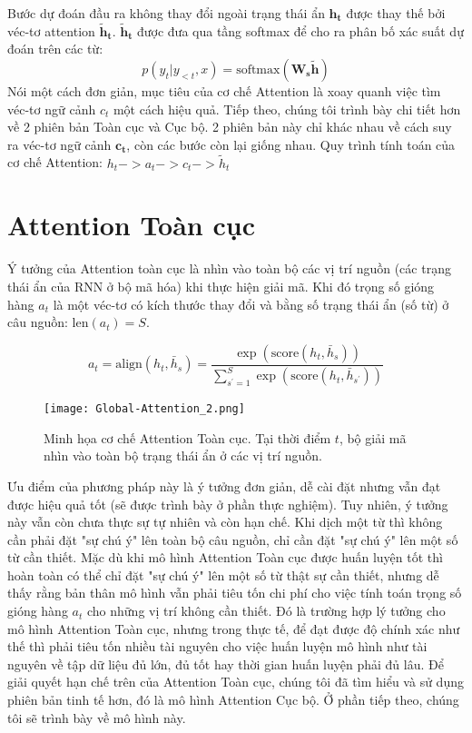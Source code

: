 Bước dự đoán đầu ra không thay đổi ngoài trạng thái ẩn $\bm{h_t}$ được thay thế bởi véc-tơ attention $\bm{\tilde{h}_t}$. $\bm{\tilde{h}_t}$ được đưa qua tầng softmax để cho ra phân bố xác suất dự đoán trên các từ:
\begin{equation}
p(y_t | y_{<t}, x) = \text{softmax}(\bm{W_s\tilde{h}})
\end{equation}
Nói một cách đơn giản, mục tiêu của cơ chế Attention là xoay quanh việc tìm véc-tơ ngữ cảnh $c_t$ một cách hiệu quả.
Tiếp theo, chúng tôi trình bày chi tiết hơn về 2 phiên bản Toàn cục và Cục bộ. 2 phiên bản này chỉ khác nhau về cách suy ra véc-tơ ngữ cảnh $\bm{c_t}$, còn các bước còn lại giống nhau.
Quy trình tính toán của cơ chế Attention: $h_t -> a_t -> c_t -> \tilde{h}_t$
\section{Attention Toàn cục}
Ý tưởng của Attention toàn cục là nhìn vào toàn bộ các vị trí nguồn (các trạng thái ẩn của RNN ở bộ mã hóa) khi thực hiện giải mã.
Khi đó trọng số gióng hàng $a_t$ là một véc-tơ có kích thước thay đổi và bằng số trạng thái ẩn (số từ) ở câu nguồn: $\text{len}(a_t) = S$.

\begin{equation}
a_t = \text{align}(h_t, \bar{h}_s) = \frac{\exp\left(\text{score}(h_t, \bar{h}_s)\right)}{\sum^{S}_{s^{'}=1}\exp\left(\text{score}(h_t, \bar{h}_{s^{'}})\right)}
\end{equation}

\begin{figure}
	\centering
	\texttt{[image: Global-Attention\_2.png]}
	\caption[Minh họa cơ chế Attention Toàn cục.]{Minh họa cơ chế Attention Toàn cục. Tại thời điểm $t$, bộ giải mã nhìn vào toàn bộ trạng thái ẩn ở các vị trí nguồn.}
	\label{fig_Global_Attention}
\end{figure}

Ưu điểm của phương pháp này là ý tưởng đơn giản, dễ cài đặt nhưng vẫn đạt được hiệu quả tốt (sẽ được trình bày ở phần thực nghiệm). Tuy nhiên, ý tưởng này vẫn còn chưa thực sự tự nhiên và còn hạn chế. Khi dịch một từ thì không cần phải đặt "sự chú ý" lên toàn bộ câu nguồn, chỉ cần đặt "sự chú ý" lên một số từ cần thiết. Mặc dù khi mô hình Attention Toàn cục được huấn luyện tốt thì hoàn toàn có thể chỉ đặt "sự chú ý" lên một số từ thật sự cần thiết, nhưng dễ thấy rằng bản thân mô hình vẫn phải tiêu tốn chi phí cho việc tính toán trọng số gióng hàng $a_t$ cho những vị trí không cần thiết. Đó là trường hợp lý tưởng cho mô hình Attention Toàn cục, nhưng trong thực tế, để đạt được độ chính xác như thế thì phải tiêu tốn nhiều tài nguyên cho việc huấn luyện mô hình như tài nguyên về tập dữ liệu đủ lớn, đủ tốt hay thời gian huấn luyện phải đủ lâu.
Để giải quyết hạn chế trên của Attention Toàn cục, chúng tôi đã tìm hiểu và sử dụng phiên bản tinh tế hơn, đó là mô hình Attention Cục bộ. Ở phần tiếp theo, chúng tôi sẽ trình bày về mô hình này.

